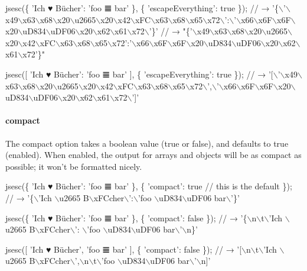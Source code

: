 \begin{DoxyCode}
jsesc(\{ 'Ich ♥ Bücher': 'foo 𝌆 bar' \}, \{
  'escapeEverything': true
\});
// →
       '\{\(\backslash\)'\(\backslash\)x49\(\backslash\)x63\(\backslash\)x68\(\backslash\)x20\(\backslash\)u2665\(\backslash\)x20\(\backslash\)x42\(\backslash\)xFC\(\backslash\)x63\(\backslash\)x68\(\backslash\)x65\(\backslash\)x72\(\backslash\)':\(\backslash\)'\(\backslash\)x66\(\backslash\)x6F\(\backslash\)x6F\(\backslash\)x20\(\backslash\)uD834\(\backslash\)uDF06\(\backslash\)x20\(\backslash\)x62\(\backslash\)x61\(\backslash\)x72\(\backslash\)'\}'
// →
       "\{'\(\backslash\)x49\(\backslash\)x63\(\backslash\)x68\(\backslash\)x20\(\backslash\)u2665\(\backslash\)x20\(\backslash\)x42\(\backslash\)xFC\(\backslash\)x63\(\backslash\)x68\(\backslash\)x65\(\backslash\)x72':'\(\backslash\)x66\(\backslash\)x6F\(\backslash\)x6F\(\backslash\)x20\(\backslash\)uD834\(\backslash\)uDF06\(\backslash\)x20\(\backslash\)x62\(\backslash\)x61\(\backslash\)x72'\}"

jsesc([ 'Ich ♥ Bücher': 'foo 𝌆 bar' ], \{
  'escapeEverything': true
\});
// →
       '[\(\backslash\)'\(\backslash\)x49\(\backslash\)x63\(\backslash\)x68\(\backslash\)x20\(\backslash\)u2665\(\backslash\)x20\(\backslash\)x42\(\backslash\)xFC\(\backslash\)x63\(\backslash\)x68\(\backslash\)x65\(\backslash\)x72\(\backslash\)',\(\backslash\)'\(\backslash\)x66\(\backslash\)x6F\(\backslash\)x6F\(\backslash\)x20\(\backslash\)uD834\(\backslash\)uDF06\(\backslash\)x20\(\backslash\)x62\(\backslash\)x61\(\backslash\)x72\(\backslash\)']'
\end{DoxyCode}


\paragraph*{{\ttfamily compact}}

The {\ttfamily compact} option takes a boolean value ({\ttfamily true} or {\ttfamily false}), and defaults to {\ttfamily true} (enabled). When enabled, the output for arrays and objects will be as compact as possible; it won’t be formatted nicely.


\begin{DoxyCode}
jsesc(\{ 'Ich ♥ Bücher': 'foo 𝌆 bar' \}, \{
  'compact': true // this is the default
\});
// → '\{\(\backslash\)'Ich \(\backslash\)u2665 B\(\backslash\)xFCcher\(\backslash\)':\(\backslash\)'foo \(\backslash\)uD834\(\backslash\)uDF06 bar\(\backslash\)'\}'

jsesc(\{ 'Ich ♥ Bücher': 'foo 𝌆 bar' \}, \{
  'compact': false
\});
// → '\{\(\backslash\)n\(\backslash\)t\(\backslash\)'Ich \(\backslash\)u2665 B\(\backslash\)xFCcher\(\backslash\)': \(\backslash\)'foo \(\backslash\)uD834\(\backslash\)uDF06 bar\(\backslash\)'\(\backslash\)n\}'

jsesc([ 'Ich ♥ Bücher', 'foo 𝌆 bar' ], \{
  'compact': false
\});
// → '[\(\backslash\)n\(\backslash\)t\(\backslash\)'Ich \(\backslash\)u2665 B\(\backslash\)xFCcher\(\backslash\)',\(\backslash\)n\(\backslash\)t\(\backslash\)'foo \(\backslash\)uD834\(\backslash\)uDF06 bar\(\backslash\)'\(\backslash\)n]'
\end{DoxyCode}


